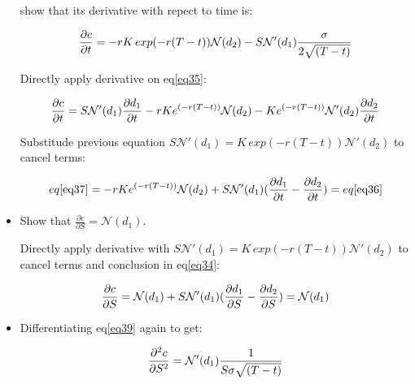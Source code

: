 \documentclass[sigconf]{acmart}
\begin{document}
\begin{itemize}
show that its derivative with repect to time is:

\begin{equation} \label{eq36}
\setlength{\abovedisplayskip}{3pt}
\setlength{\belowdisplayskip}{9pt}
\frac{\partial{c}}{\partial{t}} = -rK\, exp(-r(T-t)) \mathcal{N}(d_{2}) - S\mathcal{N'}(d_{1}) \frac{\sigma}{2\sqrt{(T-t)}}
\end{equation}

Directly apply derivative on eq\eqref{eq35}:

\begin{equation} \label{eq37}
\setlength{\abovedisplayskip}{3pt}
\setlength{\belowdisplayskip}{9pt}
\frac{\partial{c}}{\partial{t}} = S\mathcal{N'}(d_{1}) \frac{\partial{d_{1}}}{\partial{t}} - rKe^{(-r(T-t))} \mathcal{N}(d_{2}) - Ke^{(-r(T-t))}\mathcal{N'}(d_{2})\frac{\partial{d_{2}}}{\partial{t}}
\end{equation}

Substitude previous equation $S\mathcal{N'}(d_{1})=K\,exp(-r(T-t))\mathcal{N'}(d_{2})$ to cancel terms:

\begin{equation} \label{eq38}
\setlength{\abovedisplayskip}{3pt}
\setlength{\belowdisplayskip}{9pt}
eq\eqref{eq37} = - rKe^{(-r(T-t))} \mathcal{N}(d_{2}) + S\mathcal{N'}(d_{1}) (\frac{\partial{d_{1}}}{\partial{t}} - \frac{\partial{d_{2}}}{\partial{t}}) = eq\eqref{eq36}
\end{equation}

\item

Show that $\frac{\partial{c}}{\partial{S}} = \mathcal{N}(d_{1})$.

Directly apply derivative with $S\mathcal{N'}(d_{1})=K\,exp(-r(T-t))\mathcal{N'}(d_{2})$ to cancel terms and conclusion in eq\eqref{eq34}:

\begin{equation} \label{eq39}
\setlength{\abovedisplayskip}{3pt}
\setlength{\belowdisplayskip}{9pt}
\frac{\partial{c}}{\partial{S}} = \mathcal{N}(d_{1}) + S\mathcal{N'}(d_{1})(\frac{\partial{d_{1}}}{\partial{S}} - \frac{\partial{d_{2}}}{\partial{S}}) = \mathcal{N}(d_{1})
\end{equation}

\item

Differentiating eq\eqref{eq39} again to get:

\begin{equation} \label{eq40}
\setlength{\abovedisplayskip}{3pt}
\setlength{\belowdisplayskip}{9pt}
\frac{\partial^{2}{c}}{\partial{S}^{2}} = \mathcal{N'}(d_{1}) \frac{1}{S\sigma \sqrt{(T-t)}}
\end{equation}


\end{itemize}
\end{document}
